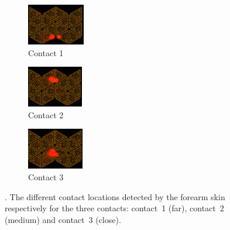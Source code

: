     
	\begin{figure}[t]
		\centering
		\begin{subfigure}[t]{0.30\hsize}
        \centering
			\includegraphics[height=1.8cm]{robertoICRA/fig/paris2_new} 
			\caption{Contact 1}
		\end{subfigure}
		\hspace{0.1cm}
		\begin{subfigure}[t]{0.30\hsize}
        \centering
			\includegraphics[height=1.8cm]{robertoICRA/fig/paris3_new} 
			\caption{Contact 2}
		\end{subfigure}
		\hspace{0.1cm}
		\begin{subfigure}[t]{0.30\hsize}
        \centering
			\includegraphics[height=1.8cm]{robertoICRA/fig/paris7_new}
			\caption{Contact 3}
		\end{subfigure}
		\caption{\textbf{}. The different contact locations detected by the forearm skin respectively for the three contacts: contact~1 (far), contact~2 (medium) and contact~3 (close).}
		\label{fig:exp2:skin}
	\end{figure}

